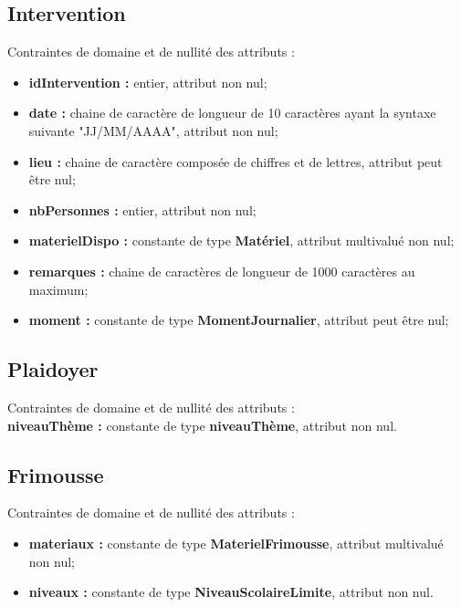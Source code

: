 \documentclass[asi, sansVersion]{picInsa}
\begin{document}
\subsection*{Intervention} 
Contraintes de domaine et de nullité des attributs :
\begin{itemize}
 	\item \textbf{idIntervention :} entier, attribut non nul;
	\item \textbf{date :} chaine de caractère de longueur de 10 caractères ayant la syntaxe suivante "JJ/MM/AAAA", attribut non nul;
	\item \textbf{lieu :} chaine de caractère composée de chiffres et de lettres, attribut peut être nul;
	\item \textbf{nbPersonnes :} entier, attribut non nul;  
	\item \textbf{materielDispo :} constante de type \textbf{Matériel}, attribut multivalué non nul; 
	\item \textbf{remarques :} chaine de caractères de longueur de 1000 caractères au maximum;
	\item \textbf{moment :} constante de type \textbf{MomentJournalier}, attribut peut être nul;\\
\end{itemize}  

\subsection*{Plaidoyer}
Contraintes de domaine et de nullité des attributs :\\
\indent \indent \textbf{niveauThème :} constante de type \textbf{niveauThème}, attribut non nul.\\

\subsection*{Frimousse}
Contraintes de domaine et de nullité des attributs :
\begin{itemize}
	\item \textbf{materiaux :} constante de type \textbf{MaterielFrimousse}, attribut multivalué non nul;
	\item \textbf{niveaux :} constante de type \textbf{NiveauScolaireLimite}, attribut non nul.\\
\end{itemize}
\end{document}
